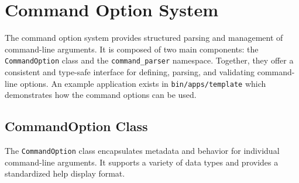 \section{Command Option System}
\label{section:cmd_option_system}

The command option system provides structured parsing and management of command-line arguments. It is composed of two main components: the \texttt{CommandOption} class and the \texttt{command\_parser} namespace. Together, they offer a consistent and type-safe interface for defining, parsing, and validating command-line options. An example application exists in \texttt{bin/apps/template} which demonstrates how the command options can be used.

\subsection{CommandOption Class}

The \texttt{CommandOption} class encapsulates metadata and behavior for individual command-line arguments. It supports a variety of data types and provides a standardized help display format.

